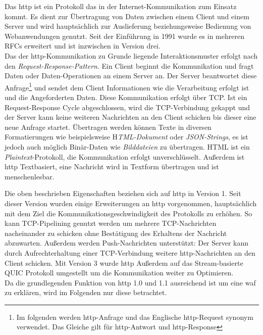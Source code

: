 Das \ac{http} ist ein Protokoll das in der Internet-Kommunikation zum Einsatz kommt.
Es dient zur Übertragung von Daten zwischen einem Client und einem Server und wird hauptsächlich zur Auslieferung beziehungsweise Bedienung von Webanwendungen genutzt.
Seit der Einführung in 1991 wurde es in mehreren RFCs erweitert und ist inzwischen in Version drei\cite{onlineIETFErhebtHTTP2022}.\\

Das der \ac{http}-Kommunikation zu Grunde liegende Interaktionsmuster erfolgt nach den \textit{Request-Response-Pattern}.
Ein Client beginnt die Kommunikation und fragt Daten oder Daten-Operationen an einem Server an.
Der Server beantwortet diese Anfrage\footnote{Im folgenden werden \ac{http}-Anfrage und das Englische \ac{http}-Request synonym verwendet. Das Gleiche gilt für \ac{http}-Antwort und \ac{http}-Response} und sendet dem Client Informationen wie die Verarbeitung erfolgt ist und die Angeforderten Daten.
Diese Kommunikation erfolgt über TCP.
Ist ein Request-Response Cycle abgeschlossen, wird die TCP-Verbindung gekappt und der Server kann keine weiteren Nachrichten an den Client schicken bis dieser eine neue Anfrage startet.
Übertragen werden können Texte in diversen Formatierungen wie beispielsweise H\textit{TML-Dokument} oder \textit{JSON-Strings}, es ist jedoch auch möglich Binär-Daten wie \textit{Bilddateien} zu übertragen.
HTML ist ein \textit{Plaintext}-Protokoll, die Kommunikation erfolgt unverschlüsselt.
Außerdem ist \ac{http} Textbasiert, eine Nachricht wird in Textform übertragen und ist menschenlesbar.

Die oben beschrieben Eigenschaften beziehen sich auf \ac{http} in Version 1.
Seit dieser Version wurden einige Erweiterungen an \ac{http} vorgenommen, hauptsächlich mit dem Ziel die Kommunikationsgeschwindigkeit des Protokolls zu erhöhen.
So kann TCP-Pipelining genutzt werden um mehrere TCP-Nachrichten nacheinander zu schicken ohne Bestätigung des Erhaltens der Nachricht abzuwarten.
Außerdem werden Push-Nachrichten unterstützt:
Der Server kann durch Aufrechterhaltung einer TCP-Verbindung weitere \ac{http}-Nachrichten an den Client schicken.
Mit Version 3 wurde \ac{http} Außerdem auf das Stream-basierte QUIC Protokoll umgestellt um die Kommunikation weiter zu Optimieren\cite{OverviewHTTPHTTP2023}.\\

Da die grundlegenden Funktion von \ac{http} 1.0 und 1.1 ausreichend ist um eine \ac{waf} zu erklären, wird im Folgenden nur diese betrachtet.

